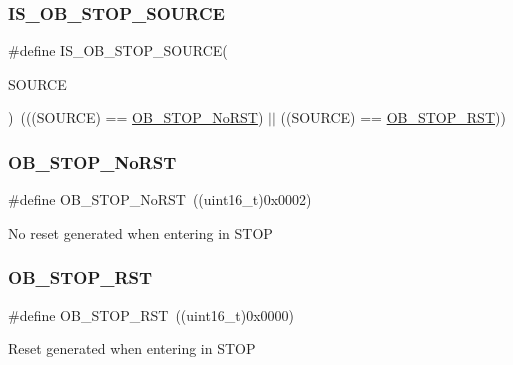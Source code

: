 \subsubsection{\texorpdfstring{IS\_OB\_STOP\_SOURCE}{IS\_OB\_STOP\_SOURCE}}
{\footnotesize\ttfamily \#define I\+S\+\_\+\+O\+B\+\_\+\+S\+T\+O\+P\+\_\+\+S\+O\+U\+R\+CE(\begin{DoxyParamCaption}\item[{}]{S\+O\+U\+R\+CE }\end{DoxyParamCaption})~(((S\+O\+U\+R\+CE) == \mbox{\hyperlink{group___option___bytes__n_r_s_t___s_t_o_p_ga6762d6e4045fec58b49dfc03c1927d51}{O\+B\+\_\+\+S\+T\+O\+P\+\_\+\+No\+R\+ST}}) $\vert$$\vert$ ((S\+O\+U\+R\+CE) == \mbox{\hyperlink{group___option___bytes__n_r_s_t___s_t_o_p_gaef92c03b1f279c532bfa13d3bb074b57}{O\+B\+\_\+\+S\+T\+O\+P\+\_\+\+R\+ST}}))}

\mbox{\label{group___option___bytes__n_r_s_t___s_t_o_p_ga6762d6e4045fec58b49dfc03c1927d51}} 
\subsubsection{\texorpdfstring{OB\_STOP\_NoRST}{OB\_STOP\_NoRST}}
{\footnotesize\ttfamily \#define O\+B\+\_\+\+S\+T\+O\+P\+\_\+\+No\+R\+ST~((uint16\+\_\+t)0x0002)}

No reset generated when entering in S\+T\+OP \mbox{\label{group___option___bytes__n_r_s_t___s_t_o_p_gaef92c03b1f279c532bfa13d3bb074b57}} 
\subsubsection{\texorpdfstring{OB\_STOP\_RST}{OB\_STOP\_RST}}
{\footnotesize\ttfamily \#define O\+B\+\_\+\+S\+T\+O\+P\+\_\+\+R\+ST~((uint16\+\_\+t)0x0000)}

Reset generated when entering in S\+T\+OP 
